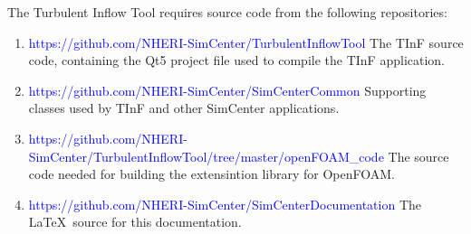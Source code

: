 \label{sec:TInFrequirements}

The Turbulent Inflow Tool requires source code from the following repositories:
\begin{enumerate}
\item \textcolor{blue}{https://github.com/NHERI-SimCenter/TurbulentInflowTool}
    The TInF source code, containing the Qt5 project file used to compile the TInF application.
\item \textcolor{blue}{https://github.com/NHERI-SimCenter/SimCenterCommon}
    Supporting classes used by TInF and other SimCenter applications.
\item
\textcolor{blue}{https://github.com/NHERI-SimCenter/TurbulentInflowTool/tree/master/openFOAM\_code}
    The source code needed for building the extensintion library for OpenFOAM.
\item \textcolor{blue}{https://github.com/NHERI-SimCenter/SimCenterDocumentation}
    The \LaTeX\ source for this documentation.
\end{enumerate}

